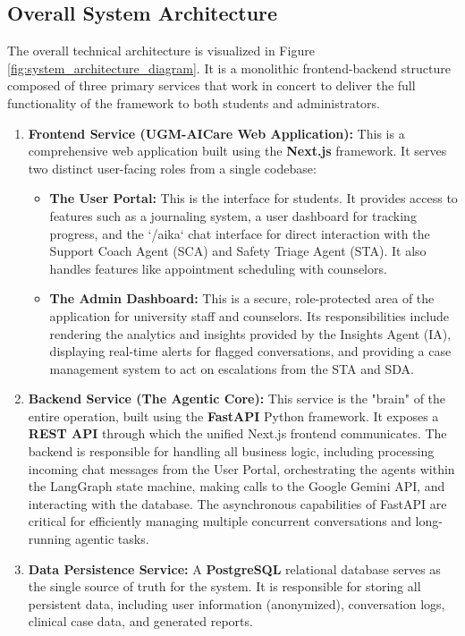 \subsection{Overall System Architecture}
\label{sec:overall_system_architecture}

The overall technical architecture is visualized in Figure \ref{fig:system_architecture_diagram}. It is a monolithic frontend-backend structure composed of three primary services that work in concert to deliver the full functionality of the framework to both students and administrators.

\begin{enumerate}
    \item \textbf{Frontend Service (UGM-AICare Web Application):} This is a comprehensive web application built using the \textbf{Next.js} framework. It serves two distinct user-facing roles from a single codebase:
        \begin{itemize}
            \item \textbf{The User Portal:} This is the interface for students. It provides access to features such as a journaling system, a user dashboard for tracking progress, and the `/aika` chat interface for direct interaction with the Support Coach Agent (SCA) and Safety Triage Agent (STA). It also handles features like appointment scheduling with counselors.
            \item \textbf{The Admin Dashboard:} This is a secure, role-protected area of the application for university staff and counselors. Its responsibilities include rendering the analytics and insights provided by the Insights Agent (IA), displaying real-time alerts for flagged conversations, and providing a case management system to act on escalations from the STA and SDA.
        \end{itemize}
    \item \textbf{Backend Service (The Agentic Core):} This service is the "brain" of the entire operation, built using the \textbf{FastAPI} Python framework. It exposes a \textbf{REST API} through which the unified Next.js frontend communicates. The backend is responsible for handling all business logic, including processing incoming chat messages from the User Portal, orchestrating the agents within the LangGraph state machine, making calls to the Google Gemini API, and interacting with the database. The asynchronous capabilities of FastAPI are critical for efficiently managing multiple concurrent conversations and long-running agentic tasks.
    \item \textbf{Data Persistence Service:} A \textbf{PostgreSQL} relational database serves as the single source of truth for the system. It is responsible for storing all persistent data, including user information (anonymized), conversation logs, clinical case data, and generated reports.
\end{enumerate}


